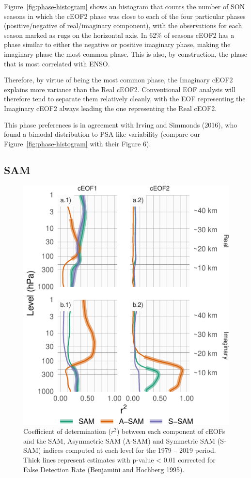 \documentclass[smallextended]{svjour3}       %
\begin{document}
Figure~\ref{fig:phase-histogram} shows an histogram that counts the number of SON seasons in which the cEOF2 phase was close to each of the four particular phases (positive/negative of real/imaginary component), with the observations for each season marked as rugs on the horizontal axis.
In 62\% of seasons cEOF2 has a phase similar to either the negative or positive imaginary phase, making the imaginary phase the most common phase.
This is also, by construction, the phase that is most correlated with ENSO.

Therefore, by virtue of being the most common phase, the Imaginary cEOF2 explains more variance than the Real cEOF2.
Conventional EOF analysis will therefore tend to separate them relatively cleanly, with the EOF representing the Imaginary cEOF2 always leading the one representing the Real cEOF2.

This phase preferences is in agreement with Irving and Simmonds (2016), who found a bimodal distribution to PSA-like variability (compare our Figure~\ref{fig:phase-histogram} with their Figure 6).

\hypertarget{sam}{%
\subsection{SAM}\label{sam}}



\begin{figure}
\centering
\includegraphics{../figures/sam-eof-vertical-1.pdf}
\caption{\label{fig:sam-eof-vertical}Coefficient of determination (\(r^2\)) between each component of cEOFs and the SAM, Asymmetric SAM (A-SAM) and Symmetric SAM (S-SAM) indices computed at each level for the 1979 -- 2019 period. Thick lines represent estimates with p-value \textless{} 0.01 corrected for False Detection Rate (Benjamini and Hochberg 1995).}
\end{figure}
\end{document}
